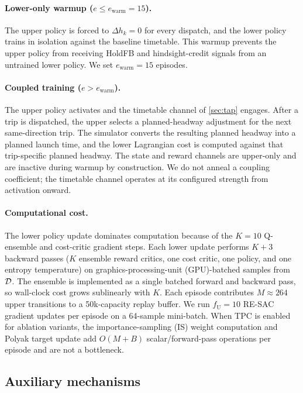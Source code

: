 \paragraph{Lower-only warmup ($e \leq e_{\mathrm{warm}} = 15$).}
The upper policy is forced to $\Delta h_k = 0$ for every dispatch, and the lower policy trains in isolation against the baseline timetable. This warmup prevents the upper policy from receiving HoldFB and hindsight-credit signals from an untrained lower policy. We set $e_{\mathrm{warm}} = 15$ episodes.

\paragraph{Coupled training ($e > e_{\mathrm{warm}}$).}
The upper policy activates and the timetable channel of \cref{sec:tap} engages. After a trip is dispatched, the upper selects a planned-headway adjustment for the next same-direction trip. The simulator converts the resulting planned headway into a planned launch time, and the lower Lagrangian cost is computed against that trip-specific planned headway. The state and reward channels are upper-only and are inactive during warmup by construction. We do not anneal a coupling coefficient; the timetable channel operates at its configured strength from activation onward.

\paragraph{Computational cost.}
The lower policy update dominates computation because of the $K{=}10$ Q-ensemble and cost-critic gradient steps.
Each lower update performs $K{+}3$ backward passes ($K$ ensemble reward critics, one cost critic, one policy, and one entropy temperature) on graphics-processing-unit (GPU)-batched samples from $\mathcal{D}$. The ensemble is implemented as a single batched forward and backward pass, so wall-clock cost grows sublinearly with $K$.
Each episode contributes $M \approx 264$ upper transitions to a 50k-capacity replay buffer. We run $f_{\mathrm{U}} = 10$ RE-SAC gradient updates per episode on a 64-sample mini-batch.
When TPC is enabled for ablation variants, the importance-sampling (IS) weight computation and Polyak target update add $O(M + B)$ scalar/forward-pass operations per episode and are not a bottleneck.

\subsection{Auxiliary mechanisms}
\label{sec:aux}


